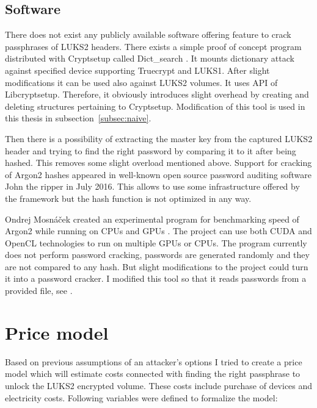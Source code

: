 \documentclass[nolof,digital]{fithesis3}
\begin{document}
\subsection{Software}
There does not exist any publicly available software offering feature to crack passphrases of LUKS2 headers. There exists a simple proof of concept program distributed with Cryptsetup called Dict\_search \parencite{cryptsetupdictsearch}. It mounts dictionary attack against specified device supporting Truecrypt and LUKS1. After slight modifications it can be used also against LUKS2 volumes. It uses API of Libcryptsetup. Therefore, it obviously introduces slight overhead by creating and deleting structures pertaining to Cryptsetup. Modification of this tool is used in this thesis in subsection~\ref{subsec:naive}.

Then there is a possibility of extracting the master key from the captured LUKS2 header and trying to find the right password by comparing it to it after being hashed. This removes some slight overload mentioned above. Support for cracking of Argon2 hashes appeared in well-known open source password auditing software John the ripper in July 2016. This allows to use some infrastructure offered by the framework but the hash function is not optimized in any way.

Ondrej Mosnáček created an experimental program for benchmarking speed of Argon2 while running on CPUs and GPUs \parencite{argon2gpu}. The project can use both CUDA and OpenCL technologies to run on multiple GPUs or CPUs. The program currently does not perform password cracking, passwords are generated randomly and they are not compared to any hash. But slight modifications to the project could turn it into a password cracker. I modified this tool so that it reads passwords from a provided file, see \parencite{argon2gpuvojta}.

\section{Price model}
\label{sec:model}
Based on previous assumptions of an attacker's options I tried to create a price model which will estimate costs connected with finding the right passphrase to unlock the LUKS2 encrypted volume. These costs include purchase of devices and electricity costs. Following variables were defined to formalize the model:
\end{document}
